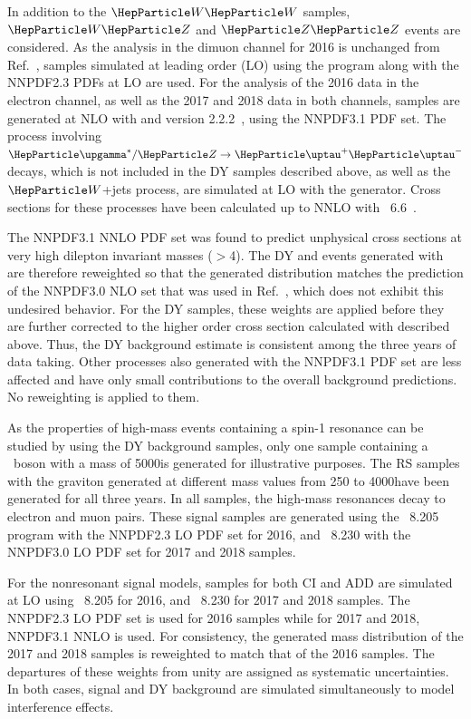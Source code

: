 \documentclass[11pt,twoside,a4paper,cmspaper,final,collab]{cms-tdr}
\begin{document}
In addition to the $\PW\PW$ samples,  $\PW\PZ$ and $\PZ\PZ$ events are considered. As the analysis in the dimuon channel for 2016 is unchanged from Ref.~\cite{Sirunyan:2018exx}, samples simulated at leading order (LO) using the \PYTHIA program along with the NNPDF2.3 PDFs at LO are used. For the analysis of the 2016 data in the electron channel, as well as the 2017 and 2018 data in both channels, samples are generated at NLO with \POWHEG and \MGvATNLO version 2.2.2~\cite{Alwall:2014hca}, using the NNPDF3.1 PDF set.
The process involving $\PGg^{\ast}/\PZ\to \Pgt^{+}\Pgt^{-}$ decays, which is not included in the \POWHEG DY samples described above, as well as the $\PW$+jets process, are simulated at LO with the \MGvATNLO generator.
Cross sections for these processes have been calculated up to NNLO with \MCFM~6.6~\cite{Boughezal:2016wmq,Campbell:2015qma,Campbell:2011bn,Campbell:1999ah}.

 The NNPDF3.1 NNLO PDF set was found to predict unphysical cross sections at very high dilepton invariant masses ($>$4\TeV). The DY and \ttbar events generated with \POWHEG are therefore reweighted so that the generated \mll distribution matches the prediction of the NNPDF3.0 NLO set that was used in Ref.~\cite{Sirunyan:2018exx}, which does not exhibit this undesired behavior. For the DY samples, these weights are applied before they are further corrected to the higher order cross section calculated with \FEWZ described above. Thus, the DY background estimate is consistent among the three years of data taking. Other processes also generated with the NNPDF3.1 PDF set are less affected and have only small contributions to the overall background predictions. No reweighting is applied to them.


As the properties of high-mass events containing a spin-1 resonance can be studied by using the DY background samples, only one sample containing a \ZPSSM~boson with a mass of 5000\GeV is generated for illustrative purposes. The RS \GKK samples with the graviton generated at different mass values from 250 to 4000\GeV have been generated for all three years. 
In all samples, the high-mass resonances decay to electron and muon pairs.
These signal samples are generated using the \PYTHIA~8.205 program with the NNPDF2.3 LO PDF set for 2016, and \PYTHIA~8.230 with the NNPDF3.0 LO PDF set for 2017 and 2018 samples.

For the nonresonant signal models, samples for both CI and ADD are simulated at LO using \PYTHIA~8.205 for 2016, and \PYTHIA~8.230 for 2017 and 2018 samples. The NNPDF2.3 LO PDF set is used for 2016 samples while for 2017 and 2018, NNPDF3.1 NNLO is used. For consistency, the generated mass distribution of the 2017 and 2018 samples is reweighted to match that of the 2016 samples. The departures of these weights from unity are assigned as systematic uncertainties. In both cases, signal and DY background are simulated simultaneously to model interference effects. 
\end{document}
